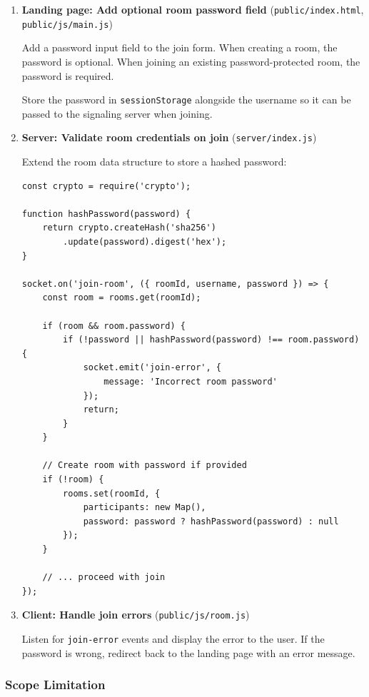 \documentclass[11pt,letterpaper]{article}
\begin{document}
\begin{enumerate}[leftmargin=2em]
    \item \textbf{Landing page: Add optional room password field} (\texttt{public/index.html}, \texttt{public/js/main.js})

    Add a password input field to the join form. When creating a room, the password is optional. When joining an existing password-protected room, the password is required.

    Store the password in \texttt{sessionStorage} alongside the username so it can be passed to the signaling server when joining.

    \item \textbf{Server: Validate room credentials on join} (\texttt{server/index.js})

    Extend the room data structure to store a hashed password:

    \begin{verbatim}
const crypto = require('crypto');

function hashPassword(password) {
    return crypto.createHash('sha256')
        .update(password).digest('hex');
}

socket.on('join-room', ({ roomId, username, password }) => {
    const room = rooms.get(roomId);

    if (room && room.password) {
        if (!password || hashPassword(password) !== room.password) {
            socket.emit('join-error', {
                message: 'Incorrect room password'
            });
            return;
        }
    }

    // Create room with password if provided
    if (!room) {
        rooms.set(roomId, {
            participants: new Map(),
            password: password ? hashPassword(password) : null
        });
    }

    // ... proceed with join
});
    \end{verbatim}

    \item \textbf{Client: Handle join errors} (\texttt{public/js/room.js})

    Listen for \texttt{join-error} events and display the error to the user. If the password is wrong, redirect back to the landing page with an error message.
\end{enumerate}

\subsubsection{Scope Limitation}
\end{document}
